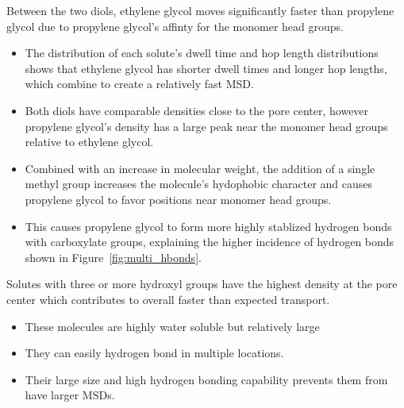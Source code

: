 \documentclass{article}
\begin{document}
  Between the two diols, ethylene glycol moves significantly faster than propylene glycol
  due to propylene glycol's affinty for the monomer head groups.  
  \begin{itemize}
  	\item The distribution of each solute's dwell time and hop length distributions shows that
  	ethylene glycol has shorter dwell times and longer hop lengths, which combine to create a 
  	relatively fast MSD. 
    \item Both diols have comparable densities close to the pore center, however propylene glycol's
    density has a large peak near the monomer head groups relative to ethylene glycol. 
    \item Combined with an increase in molecular weight, the addition of a single methyl group
    increases the molecule's hydophobic character and causes propylene glycol to favor positions
    near monomer head groups.
    \item This causes propylene glycol to form more highly stablized hydrogen bonds with
    carboxylate groups, explaining the higher incidence of hydrogen bonds shown in Figure~\ref{fig:multi_hbonds}.
  \end{itemize}
  
  Solutes with three or more hydroxyl groups have the highest density
  at the pore center which contributes to overall faster than expected transport.
  \begin{itemize}
  	\item These molecules are highly water soluble but relatively large
  	\item They can easily hydrogen bond in multiple locations.
  	\item Their large size and high hydrogen bonding capability prevents them
  	from have larger MSDs.
  \end{itemize}
  
  
\end{document}
